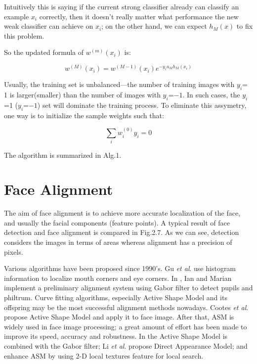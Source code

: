 \documentclass[12pt, twoside]{report}
\begin{document}
	\par
	Intuitively this is saying if the current strong classifier already can classify an example $x_i$ correctly, then it doesn’t really matter what performance the new weak classifier can achieve on $x_i$; on the other hand, we can expect $h_M(x)$ to fix this problem.

	\par	
	So the updated formula of $w^{(m)}(x_i)$ is:

	\begin{equation}
		w^{(M)}(x_i) = w^{(M-1)}(x_i)e^{-y_ia_Mh_M(x_i)}
	\end{equation}

	\par	
	Usually, the training set is unbalanced—the number of training images with $y_i$= 1 is larger(smaller) than the number of images with $y_i$=$-1$. In such cases, the $y_i$=1 ($y_i$=$-1$) set will dominate the training process. To eliminate this assymetry, one way is to initialize the sample weights such that:

	\begin{equation}
		\sum_{i}w_i^{(0)} y_i = 0
	\end{equation}

	\par
	The algorithm is summarized in Alg.1.
	
	\section{Face Alignment}
	The aim of face alignment is to achieve more accurate localization of the face, and usually the facial components (feature points). A typical result of face detection and face alignment is compared in Fig.2.7. As we can see, detection considers the images in terms of areas whereas alignment has a precision of pixels.
	\par
	Various algorithms have been proposed since 1990's. Gu \textit{ et al}. \cite{29} use histogram information to localize mouth corners and eye corners. In \cite{26}, Ian and Marian implement a preliminary alignment system using Gabor filter to detect pupils and philtrum. Curve fitting algorithms, especially Active Shape Model \cite{18} and its offspring may be the most successful alignment methods nowadays. Cootes \textit{ et al}. \cite{18} \cite{45} \cite{16} propose Active Shape Model and apply it to face image. After that, ASM is widely used in face image processing; a great amount of effort has been made to improve its speed, accuracy and robustness. In \cite{36} the Active Shape Model is combined with the Gabor filter;
	Li \textit{ et al}. \cite{78} propose Direct Appearance Model; \cite{56} and \cite{101} enhance ASM by using 2-D local textures feature for local search. 
\end{document}
